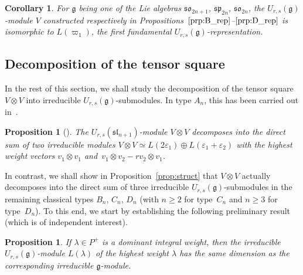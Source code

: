 \documentclass[pdftex]{sigma}
\numberwithin{equation}{section}
\newtheorem{Corollary}[Theorem]{Corollary}
\newtheorem{Proposition}[Theorem]{Proposition}
 { \theoremstyle{definition}
\newtheorem{Definition}[Theorem]{Definition}
\newtheorem{Note}[Theorem]{Note}
\newtheorem{Example}[Theorem]{Example}
\newtheorem{Remark}[Theorem]{Remark} }
\newcommand{\fg}{\mathfrak{g}}
\newcommand{\ssl}{\mathfrak{sl}}
\newcommand{\sso}{\mathfrak{so}}
\newcommand{\ssp}{\mathfrak{sp}}
\newcommand{\uu}{U_{r,s}(\fg)}
\begin{document}
\begin{Corollary}
For $\fg$ being one of the Lie algebras $\sso_{2n+1}$, $\ssp_{2n}$, $\sso_{2n}$, the $U_{r,s}(\fg)$-module $V$ constructed respectively in Propositions~$\ref{prp:B_rep}$--$\ref{prp:D_rep}$ is isomorphic to $L(\varpi_1)$, the first fundamental $\uu$-representation.
\end{Corollary}

\subsection{Decomposition of the tensor square}%

In the rest of this section, we shall study the decomposition of the tensor square $V\otimes V$ into irreducible $U_{r,s}(\fg)$-submodules. In type $A_n$, this has been carried out in~\cite[Proposition~5.3]{BW2}.

\begin{Proposition}[{\cite{BW2}}]
The $U_{r,s}(\ssl_{n+1})$-module $V\otimes V$ decomposes into the direct sum of two irreducible modules $V\otimes V\simeq L(2\varepsilon_1)\oplus L(\varepsilon_1+\varepsilon_2)$ with the highest weight vectors $v_1\otimes v_1$ and~${v_1\otimes v_2 - r v_2\otimes v_1}$.
\end{Proposition}

In contrast, we shall show in Proposition~\ref{prop:struct} that $V\otimes V$ actually decomposes into the direct sum of three irreducible $U_{r,s}(\fg)$-submodules in the remaining classical types $B_n$, $C_n$, $D_n$ (with $n\geq 2$ for type~$C_n$ and $n\geq 3$ for type~$D_n$). To this end, we start by establishing the following preliminary result (which is of independent interest).

\begin{Proposition}\label{lem:dim}
If $\lambda \in P^+$ is a dominant integral weight, then the irreducible $U_{r,s}(\fg)$-module $L(\lambda)$ of the highest weight $\lambda$ has the same dimension as the corresponding irreducible $\fg$-module.
\end{Proposition}
\end{document}
